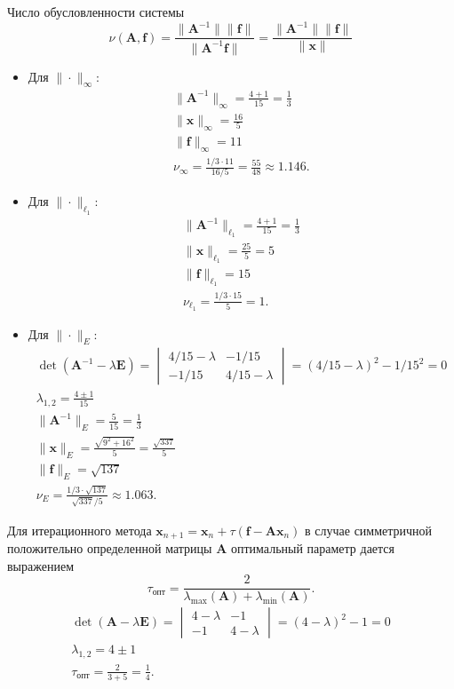 \documentclass[12pt]{article}
\renewcommand{\vec}[1]{\boldsymbol{\mathbf{#1}}}
\begin{document}
Число обусловленности системы
\[
\nu(\vec A, \vec f) = \frac{\|\vec A^{-1}\| \|\vec f\|}{\|\vec A^{-1} \vec f\|} = \frac{\|\vec A^{-1}\| \|\vec f\|}{\|\vec x\|}
\]
\begin{itemize}
\item Для $\|\cdot\|_\infty$:
\begin{gather*}
\|\vec A^{-1}\|_\infty = \frac{4 + 1}{15} = \frac{1}{3}\\
\|\vec x\|_\infty = \frac{16}{5}\\
\|\vec f\|_\infty = 11\\
\nu_\infty = \frac{1/3 \cdot 11}{16/5} = \frac{55}{48} \approx 1.146.
\end{gather*}
\item Для $\|\cdot\|_{\ell_1}$:
\begin{gather*}
\|\vec A^{-1}\|_{\ell_1} = \frac{4 + 1}{15} = \frac{1}{3}\\
\|\vec x\|_{\ell_1} = \frac{25}{5} = 5\\
\|\vec f\|_{\ell_1} = 15\\
\nu_{\ell_1} = \frac{1/3 \cdot 15}{5} = 1.
\end{gather*}
\item Для $\|\cdot\|_E$:
\begin{gather*}
\det (\vec A^{-1} - \lambda \vec E) = 
\begin{vmatrix}
4/15 - \lambda & -1/15\\
-1/15 & 4/15 - \lambda
\end{vmatrix} = (4/15 - \lambda)^2 - 1/15^2 = 0\\
\lambda_{1,2} = \frac{4 \pm 1}{15}\\
\|\vec A^{-1}\|_E = \frac{5}{15} = \frac{1}{3}\\
\|\vec x\|_E = \frac{\sqrt{9^2 + 16^2}}{5} = 
\frac{\sqrt{337}}{5}\\
\|\vec f\|_E = \sqrt{137}\\
\nu_E = \frac{1/3 \cdot \sqrt{137}}{\sqrt{337}/5} \approx 1.063.
\end{gather*}
\end{itemize}

Для итерационного метода $\vec x_{n+1} = \vec x_n + \tau (\vec f - \vec {Ax}_n)$ в случае симметричной положительно определенной матрицы $\vec A$ оптимальный параметр дается выражением
\[
\tau_\text{опт} = \frac{2}{\lambda_{\max}(\vec A) + \lambda_{\min}(\vec A)}.
\]
\begin{gather*}
\det (\vec A - \lambda \vec E) = 
\begin{vmatrix}
4 - \lambda & -1\\
-1 & 4 - \lambda
\end{vmatrix} = (4 - \lambda)^2 - 1 = 0\\
\lambda_{1,2} = 4 \pm 1\\
\tau_\text{опт} = \frac{2}{3 + 5} = \frac{1}{4}.
\end{gather*}
\end{document}
